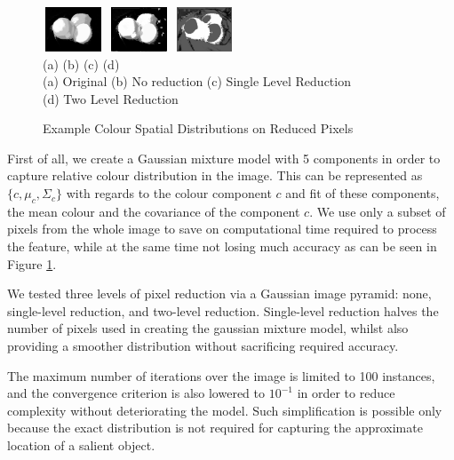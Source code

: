 \documentclass[10pt,twocolumn,letterpaper]{article}
\newcommand{\hs}{\hspace{0.58in}}
\begin{document}
\begin{figure}[t]
\begin{center}
    \includegraphics[width=0.72in,height=0.52in]{./Figures/pydownCompare/3NOPYDOWN.jpg}
    \includegraphics[width=0.72in,height=0.52in]{./Figures/pydownCompare/3PYDOWN.jpg} 
    \includegraphics[width=0.72in,height=0.52in]{./Figures/pydownCompare/3DOUBLEPYDOWN.jpg} \\
    \footnotesize \hspace{0.1cm} (a) \hs (b) \hs  (c) \hs (d) \\
    \footnotesize (a) Original (b) No reduction (c) Single Level Reduction\\ (d) Two Level Reduction
    \caption{Example Colour Spatial Distributions on Reduced Pixels} \label{Fig:GlobalPydown}
    \end{center}
\end{figure}

First of all, we create a Gaussian mixture model with 5 components in order to capture relative colour distribution in the image. This can be represented as $\{c, \mu_c, \Sigma_c\}$ with regards to the colour component $c$ and fit of these components, the mean colour and the covariance of the component $c$.  We use only a subset of pixels from the whole image to save on computational time required to process the feature, while at the same time not losing much accuracy as can be seen in Figure \ref{Fig:GlobalPydown}.  

We tested three levels of pixel reduction via a Gaussian image pyramid: none, single-level reduction, and two-level reduction.  Single-level reduction halves the number of pixels used in creating the gaussian mixture model, whilst also providing a smoother distribution without sacrificing required accuracy.  

The maximum number of iterations over the image is limited to 100 instances, and the convergence criterion is also lowered to $10^{-1}$ in order to reduce complexity without deteriorating the model.  Such simplification is possible only because the exact distribution is not required for capturing the approximate location of a salient object.
\end{document}
